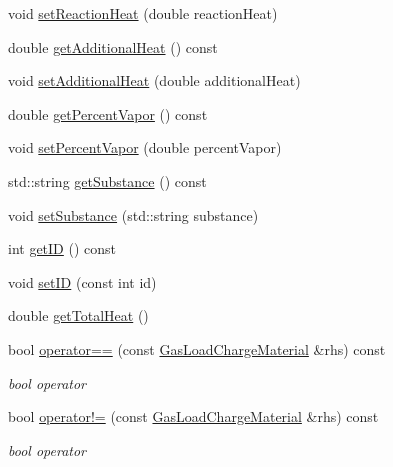 \begin{DoxyCompactItemize}
void \hyperlink{class_gas_load_charge_material_a721f02cbd0bfbb6ebe67c0da09f0b0f2}{set\+Reaction\+Heat} (double reaction\+Heat)
\item 
double \hyperlink{class_gas_load_charge_material_a5c01f171b61c01c93db6453cb122e1ba}{get\+Additional\+Heat} () const
\item 
void \hyperlink{class_gas_load_charge_material_a08ef5196ea9919dfc71be6744c7da08e}{set\+Additional\+Heat} (double additional\+Heat)
\item 
double \hyperlink{class_gas_load_charge_material_a19b8ecfad235b5824b0a88903cff667a}{get\+Percent\+Vapor} () const
\item 
void \hyperlink{class_gas_load_charge_material_acace81e16ef531acb0a68462ab0ed25d}{set\+Percent\+Vapor} (double percent\+Vapor)
\item 
std\+::string \hyperlink{class_gas_load_charge_material_a5f967841f196f6b0b35f32f9610092e3}{get\+Substance} () const
\item 
void \hyperlink{class_gas_load_charge_material_a20cc3df601d8daae9b8f8e7b0c53c2e3}{set\+Substance} (std\+::string substance)
\item 
int \hyperlink{class_gas_load_charge_material_ab3e425ad095a593b7e9e365606759d9d}{get\+ID} () const
\item 
void \hyperlink{class_gas_load_charge_material_a12d67d6f764318ab09ca340884e717f9}{set\+ID} (const int id)
\item 
double \hyperlink{class_gas_load_charge_material_a4f831537652ca09c4539982c626cc164}{get\+Total\+Heat} ()
\item 
\mbox{\label{class_gas_load_charge_material_ac1d95bdf7d61d8ed98629aa17bf2c4b1}} 
bool \hyperlink{class_gas_load_charge_material_ac1d95bdf7d61d8ed98629aa17bf2c4b1}{operator==} (const \hyperlink{class_gas_load_charge_material}{Gas\+Load\+Charge\+Material} \&rhs) const
\begin{DoxyCompactList}\small\item\em bool operator \end{DoxyCompactList}\item 
\mbox{\label{class_gas_load_charge_material_ac6bc3f665a91fde01ebf6d1528cb7332}} 
bool \hyperlink{class_gas_load_charge_material_ac6bc3f665a91fde01ebf6d1528cb7332}{operator!=} (const \hyperlink{class_gas_load_charge_material}{Gas\+Load\+Charge\+Material} \&rhs) const
\begin{DoxyCompactList}\small\item\em bool operator \end{DoxyCompactList}\item 

\end{DoxyCompactItemize}
